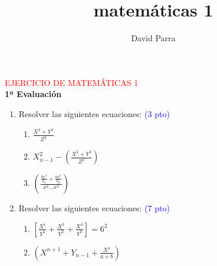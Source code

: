 \documentclass[10pt,a4paper]{article}
\author{David Parra}
\title{matemáticas 1}
\begin{document}
\begin{center}
\LARGE{\textcolor{red}{EJERCICIO DE MATEMÁTICAS 1}} \vspace{1cm} \\
\Large{\bf 1ª Evaluación}
\end{center}
\begin{enumerate}
\item Resolver las siguientes ecuaciones: \textcolor{blue}{(3 pto)}
\begin{enumerate}
\item $\frac{X^2+Y^2}{Z^2}$
\item $X^2_{n-1}-\left(\frac{X^2+Y^2}{Z^2}\right)$
\item $\left(\frac{\frac{bx^3}{b_1}+\frac{bx^4}{b_2}}{x^2...x^3}\right)$
\end{enumerate}
\item Resolver las siguientes ecuaciones: \textcolor{blue}{(7 pto)}
\begin{enumerate}
\item$\left[\frac{X^1}{Y^1}+\frac{X^2}{Y^2}+\frac{X^3}{Y^3}\right]=6^2$
\item$\left(X^{n+1}+Y_{n-1}+\frac{X^4}{a+b}\right)$
\end{enumerate}
\end{enumerate}
\end{document}
